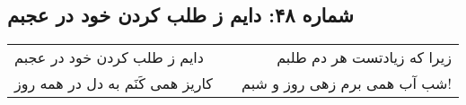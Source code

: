 \begin{center}
\section*{شماره ۴۸: دایم ز طلب کردن خود در عجبم}
\label{sec:048}
\begin{longtable}{l p{0.5cm} r}
دایم ز طلب کردن خود در عجبم
&&
زیرا که زیادتست هر دم طلبم
\\
کاریز همی کَنَم به دل در همه روز
&&
شب آب همی برم زهی روز و شبم!
\\
\end{longtable}
\end{center}
